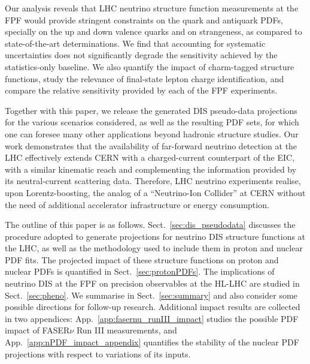 Our analysis reveals that  LHC neutrino structure function measurements at the FPF
would  provide  stringent constraints
on the quark and antiquark PDFs, specially on the up and down
valence quarks and on strangeness, as compared to state-of-the-art determinations.
%
We find that accounting for systematic uncertainties does not significantly
degrade the sensitivity achieved by the statistics-only baseline.
%
We also quantify the impact of charm-tagged structure functions, study the relevance
of final-state lepton charge identification, and compare the relative sensitivity
provided by each of the FPF experiments.

Together with this paper, we release the generated  DIS pseudo-data projections for the various scenarios
considered, as well as the resulting PDF sets, for which one can foresee
many other applications beyond hadronic structure studies.
%
Our work demonstrates that the availability of far-forward neutrino detection
at the LHC effectively
extends CERN with a charged-current counterpart of the EIC,
with a similar kinematic reach and complementing
the information provided by its neutral-current scattering data.
%
Therefore, LHC neutrino experiments realise, upon Lorentz-boosting, the analog of
a ``Neutrino-Ion Collider'' at CERN
without the need of additional accelerator infrastructure or energy consumption.

The outline of this paper is as follows.
%
Sect.~\ref{sec:dis_pseudodata} discusses the procedure
adopted to generate projections for neutrino DIS structure functions at the LHC,
as well as the methodology used
to include them in proton and nuclear PDF fits.
%
The projected impact of these structure functions on proton and nuclear
PDFs is quantified in Sect.~\ref{sec:protonPDFs}.
%
The implications of neutrino DIS at the FPF on precision observables
at the HL-LHC are studied in Sect.~\ref{sec:pheno}.
%
We summarise in Sect.~\ref{sec:summary} and also consider some possible
directions for follow-up research.
%
Additional impact results are collected in two appendices:
App.~\ref{app:fasernu_runIII_impact} studies the possible PDF impact
of FASER$\nu$ Run III measurements, and App.~\ref{app:nPDF_impact_appendix}
quantifies the stability of the nuclear PDF projections with respect
to variations of its inputs.
